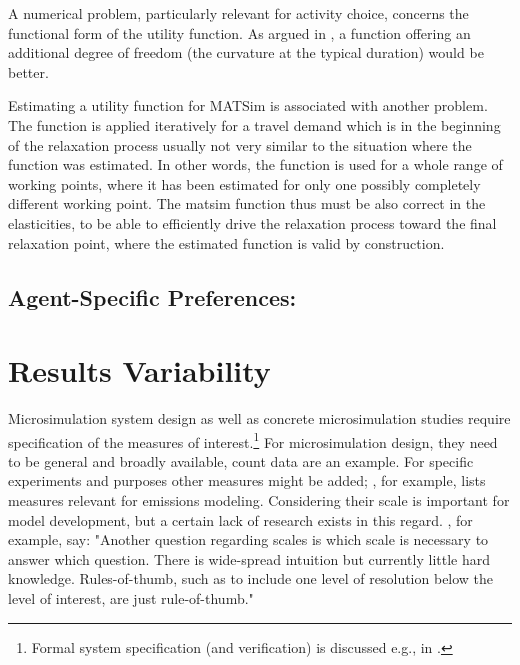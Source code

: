 {A numerical problem, particularly relevant for activity choice, concerns the functional form of the utility function. As argued in \citet[][p.33]{MATSim_Userguide_2014}, a function offering an additional degree of freedom (the curvature at the typical duration) would be better.

Estimating a utility function for MATSim is associated with another problem. The function is applied iteratively for a travel demand which is in the beginning of the relaxation process usually not very similar to the situation where the function was estimated. In other words, the function is used for a whole range of working points, where it has been estimated for only one  possibly completely different working point. The \gls{matsim} function thus must be also correct in the elasticities, to be able to efficiently drive the relaxation process toward the final relaxation point, where the estimated function is valid by construction. 
}

\subsection{Agent-Specific Preferences:}
\label{sec:agent-specific-prefs}


\vfill\eject
\section{Results Variability}
\label{sec:variability}
Microsimulation system design as well as concrete microsimulation studies require specification of the measures  of interest.\footnote{%
Formal system specification (and verification) is discussed e.g., in \citet[][]{FisherWooldridge_IJCIS_1997, BourahlaBenmohamed_ENTCS_2005}. 
} For microsimulation design, they need to be general and broadly available, count data are an example. For specific experiments and purposes other measures might be added; \citet[][]{Kitamura_TMIP_1996}, for example, lists measures relevant for emissions modeling. Considering their scale is important for model development, but a certain lack of research exists in this regard. \citet[][Section 2.2]{NagelAxhausen_TechRep_IVT_2001}, for example, say: "Another question regarding scales is which scale is necessary to answer which question. There is wide-spread intuition but currently little hard knowledge. Rules-of-thumb, such as to include one level of resolution below the level of interest, are just rule-of-thumb." 

